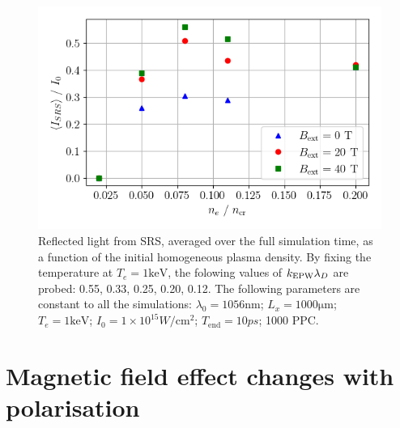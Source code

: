 \begin{figure}[ht]
   \centering
    \includegraphics[width=0.9\columnwidth]{Chapters/C6_magSRS/kld_scan_SRS_scaling.png}
    \caption{Reflected light from SRS, averaged over the full simulation time, as a function of the initial homogeneous plasma density. By fixing the temperature at $T_e = 1\si{\kilo\electronvolt}$, the folowing values of $k_\mathrm{EPW}\lambda_D$ are probed: 0.55, 0.33, 0.25, 0.20, 0.12. The following parameters are constant to all the simulations: 
 $\lambda_0 = 1056 \si{\nano\metre}$; $L_x = 1000 \si{\micro\metre}$; $T_e = 1 \si{\kilo\electronvolt}$; $I_0 = 1\times 10^{15}\si{W/\cm^2}$; $T_{\mathrm{end}}=10 \si{ps}$; 1000 PPC.}
    \label{fig:SRS_EPOCH}
\end{figure}{}


\section{Magnetic field effect changes with polarisation}




